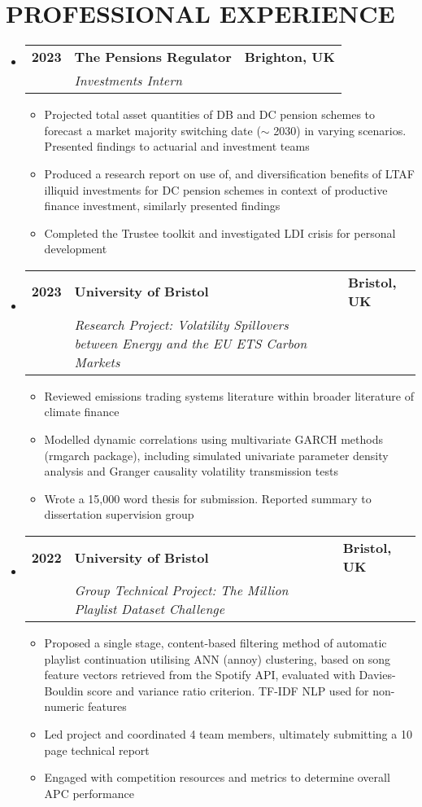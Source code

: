 \documentclass[letterpaper,10pt]{article}
\newcommand{\resumeItem}[1]{
  \item \small{#1 \vspace{-3pt}}
}
\newcommand{\resumeSubheading}[6]{
  \vspace{-2pt}\item
  \begin{tabular*}{1.0\textwidth}[t]{p{2.5cm}p{15.05cm}l}
    \textbf{\small #1} & \textbf{\small #2} & \textbf{\small #3} \\
    \textit{\small#4} & \textit{\small #5} & \textit{\small #6} \\
  \end{tabular*}\vspace{-7pt}
}
\newcommand{\resumeSubHeadingListStart}{\begin{itemize}[leftmargin=0.0in, label={}]}
\newcommand{\resumeSubHeadingListEnd}{\end{itemize}}
\newcommand{\resumeItemListStart}{\begin{itemize}}
\newcommand{\resumeItemListEnd}{\end{itemize}\vspace{-5pt}}
\begin{document}
\section{\small\centering PROFESSIONAL EXPERIENCE}
\vspace{5pt}
\resumeSubHeadingListStart
    \resumeSubheading
     {2023}{The Pensions Regulator}{Brighton, UK}
     {}{Investments Intern}{}
         \resumeItemListStart
            \resumeItem{Projected total asset quantities of DB and DC pension schemes to forecast a market majority switching date \newline ($\sim$ 2030) in varying scenarios. Presented findings to actuarial and investment teams}
            \resumeItem{Produced a research report on use of, and diversification benefits of LTAF illiquid investments for DC pension schemes in context of productive finance investment, similarly presented findings}
            \resumeItem{Completed the Trustee toolkit and investigated LDI crisis for personal development}
        \resumeItemListEnd

    \resumeSubheading
      {2023}{University of Bristol}{Bristol, UK}
      {}{Research Project: Volatility Spillovers between Energy and the EU ETS Carbon Markets}{}
        \resumeItemListStart
            \resumeItem{Reviewed emissions trading systems literature within broader literature of climate finance}
            \resumeItem{Modelled dynamic correlations using multivariate GARCH methods (rmgarch package), including simulated univariate parameter density analysis and Granger causality volatility transmission tests}
            \resumeItem{Wrote a 15,000 word thesis for submission. Reported summary to dissertation supervision group}
        \resumeItemListEnd
    \resumeSubheading
      {2022}{University of Bristol}{Bristol, UK}
      {}{Group Technical Project: The Million Playlist Dataset Challenge}{}
        \resumeItemListStart
            \resumeItem{Proposed a single stage, content-based filtering method of automatic playlist continuation utilising ANN (annoy) clustering, based on song feature vectors retrieved from the Spotify API, evaluated with Davies-Bouldin score and variance ratio criterion. TF-IDF NLP used for non-numeric features}
            \resumeItem{Led project and coordinated 4 team members, ultimately submitting a 10 page technical report}
            \resumeItem{Engaged with competition resources and metrics to determine overall APC performance}
        \resumeItemListEnd
\resumeSubHeadingListEnd
%
\end{document}

